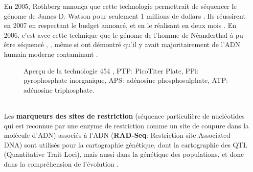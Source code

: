 \documentclass[a4paper]{article}
\begin{document}
En 2005, Rothberg annonça que cette technologie permettrait de séquencer le génome de James D. Watson pour seulement 1 millions de dollars \cite{Margulies:2005aa} \cite{sengenes2012developpement}.
Ils réussirent en 2007 en respectant le budget annoncé, et en le réalisant en deux mois \cite{wheeler2008complete}. En 2006, c'est avec cette technique que le génome de l'homme de Néanderthal à pu être séquencé \cite{green2006analysis}, \cite{noonan2006sequencing}, même si \cite{Wall:2007aa} ont démontré qu'il y avait majoritairement de l'ADN humain moderne contaminant \cite{sengenes2012developpement}.

\begin{figure}[!h]
\caption{Aperçu de la technologie 454 \cite{sengenes2012developpement}, PTP: PicoTiter Plate, PPi: pyrophosphate inorganique, APS: adénosine phosphosulphate, ATP: adénosine triphosphate.\label{1}}
\end{figure}

~~\\

Les \textbf{marqueurs des sites de restriction} (séquence particulière de nucléotides qui est reconnue par une enzyme de restriction comme un site de coupure dans la molécule d'ADN) associés à l'ADN (\textbf{RAD-Seq}: Restriction site Associated DNA) sont utilisés pour la cartographie génétique, dont la cartographie des QTL (Quantitative Trait Loci), mais aussi dans la génétique des populations, et donc dans la compréhension de l'évolution \cite{davey2010radseq}. 
\end{document}

